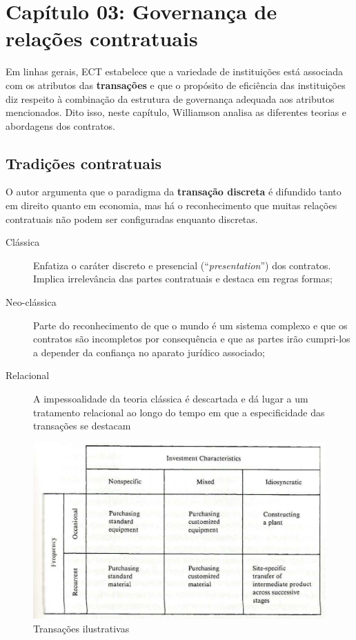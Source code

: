 \section*{Capítulo 03: Governança de relações contratuais}

Em linhas gerais, ECT estabelece que a variedade de instituições está associada com os atributos das \textbf{transações} e que o propósito de eficiência das instituições diz respeito à combinação da estrutura de governança adequada aos atributos mencionados. Dito isso, neste capítulo, Williamson analisa as diferentes teorias e abordagens dos contratos.

\subsection*{Tradições contratuais}

O autor argumenta que o paradigma da \textbf{transação discreta} é difundido tanto em direito quanto em economia, mas há o reconhecimento que muitas relações contratuais não podem ser configuradas enquanto discretas.

\begin{description}
	\item[Clássica] Enfatiza o caráter discreto e presencial (``\textit{presentation}'') dos contratos. Implica irrelevância das partes contratuais e destaca em regras formas;
	\item[Neo-clássica] Parte do reconhecimento de que o mundo é um sistema complexo e que os contratos são incompletos por consequência e que as partes irão cumpri-los a depender da confiança no aparato jurídico associado;
	\item[Relacional] A impessoalidade da teoria clássica é descartada e dá lugar a um tratamento relacional ao longo do tempo em que a especificidade das transações se destacam
\end{description}


\begin{figure}[h]
	\centering
	\caption{Transações ilustrativas}
	\label{fig:screenshot006}
	\includegraphics[width=0.7\linewidth]{screenshot006}
\end{figure}



